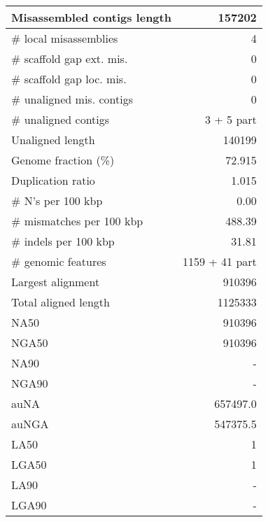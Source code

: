 \documentclass[12pt,a4paper]{article}
\begin{document}
\begin{table}[ht]
\begin{center}
\begin{tabular}{|l*{1}{|r}|}
Misassembled contigs length & 157202 \\ \hline
\# local misassemblies & 4 \\ \hline
\# scaffold gap ext. mis. & 0 \\ \hline
\# scaffold gap loc. mis. & 0 \\ \hline
\# unaligned mis. contigs & 0 \\ \hline
\# unaligned contigs & 3 + 5 part \\ \hline
Unaligned length & 140199 \\ \hline
Genome fraction (\%) & 72.915 \\ \hline
Duplication ratio & 1.015 \\ \hline
\# N's per 100 kbp & 0.00 \\ \hline
\# mismatches per 100 kbp & 488.39 \\ \hline
\# indels per 100 kbp & 31.81 \\ \hline
\# genomic features & 1159 + 41 part \\ \hline
Largest alignment & 910396 \\ \hline
Total aligned length & 1125333 \\ \hline
NA50 & 910396 \\ \hline
NGA50 & 910396 \\ \hline
NA90 & - \\ \hline
NGA90 & - \\ \hline
auNA & 657497.0 \\ \hline
auNGA & 547375.5 \\ \hline
LA50 & 1 \\ \hline
LGA50 & 1 \\ \hline
LA90 & - \\ \hline
LGA90 & - \\ \hline
\end{tabular}
\end{center}
\end{table}
\end{document}
